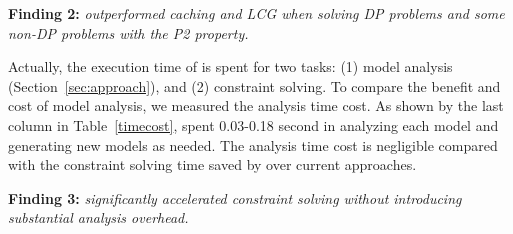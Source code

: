 \begin{tcolorbox}
	\textbf{Finding 2:} \emph{
	\tool outperformed caching and LCG when solving DP problems and some non-DP problems with the P2 property.}
\end{tcolorbox}

Actually, the execution time of \tool is spent for two tasks: (1) model analysis (Section~\ref{sec:approach}), and (2) constraint solving. To compare the benefit and cost of model analysis, we measured the analysis time cost. 
As shown by the last column in Table~\ref{timecost}, \tool spent 0.03-0.18 second in analyzing each model and generating new models as needed. The analysis time cost is negligible compared with the constraint solving time saved by \tool over current approaches. 

\begin{tcolorbox}
	\textbf{Finding 3:} \emph{
	\tool significantly accelerated constraint solving without introducing substantial analysis overhead.}
\end{tcolorbox}